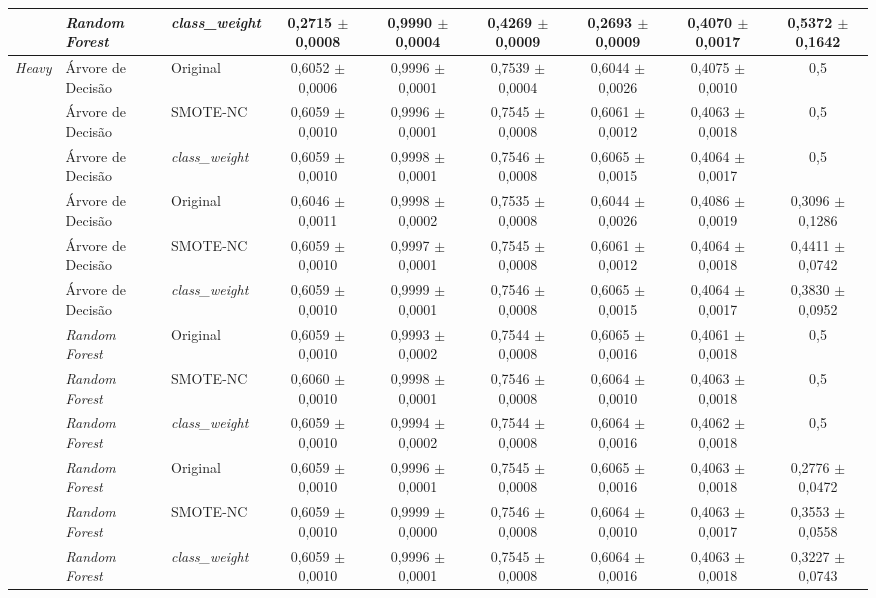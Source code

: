 \begin{table}[htb]
{\begin{tabular}{lllcccccc}
     & \textit{Random Forest} & \textit{class\_weight} & 0,2715 $\pm$ 0,0008 & 0,9990 $\pm$ 0,0004 & 0,4269 $\pm$ 0,0009 & 0,2693 $\pm$ 0,0009 & 0,4070 $\pm$ 0,0017 & 0,5372 $\pm$ 0,1642 \\
    \hline
    \textit{Heavy} & Árvore de Decisão & Original & 0,6052 $\pm$ 0,0006 & 0,9996 $\pm$ 0,0001 & 0,7539 $\pm$ 0,0004 & 0,6044 $\pm$ 0,0026 & 0,4075 $\pm$ 0,0010 & 0,5 \\
     & Árvore de Decisão & SMOTE-NC & 0,6059 $\pm$ 0,0010 & 0,9996 $\pm$ 0,0001 & 0,7545 $\pm$ 0,0008 & 0,6061 $\pm$ 0,0012 & 0,4063 $\pm$ 0,0018 & 0,5 \\
     & Árvore de Decisão & \textit{class\_weight} & 0,6059 $\pm$ 0,0010 & 0,9998 $\pm$ 0,0001 & 0,7546 $\pm$ 0,0008 & 0,6065 $\pm$ 0,0015 & 0,4064 $\pm$ 0,0017 & 0,5 \\
     & Árvore de Decisão & Original & 0,6046 $\pm$ 0,0011 & 0,9998 $\pm$ 0,0002 & 0,7535 $\pm$ 0,0008 & 0,6044 $\pm$ 0,0026 & 0,4086 $\pm$ 0,0019 & 0,3096 $\pm$ 0,1286 \\
     & Árvore de Decisão & SMOTE-NC & 0,6059 $\pm$ 0,0010 & 0,9997 $\pm$ 0,0001 & 0,7545 $\pm$ 0,0008 & 0,6061 $\pm$ 0,0012 & 0,4064 $\pm$ 0,0018 & 0,4411 $\pm$ 0,0742 \\
     & Árvore de Decisão & \textit{class\_weight} & 0,6059 $\pm$ 0,0010 & 0,9999 $\pm$ 0,0001 & 0,7546 $\pm$ 0,0008 & 0,6065 $\pm$ 0,0015 & 0,4064 $\pm$ 0,0017 & 0,3830 $\pm$ 0,0952 \\
     & \textit{Random Forest} & Original & 0,6059 $\pm$ 0,0010 & 0,9993 $\pm$ 0,0002 & 0,7544 $\pm$ 0,0008 & 0,6065 $\pm$ 0,0016 & 0,4061 $\pm$ 0,0018 & 0,5 \\
     & \textit{Random Forest} & SMOTE-NC & 0,6060 $\pm$ 0,0010 & 0,9998 $\pm$ 0,0001 & 0,7546 $\pm$ 0,0008 & 0,6064 $\pm$ 0,0010 & 0,4063 $\pm$ 0,0018 & 0,5 \\
     & \textit{Random Forest} & \textit{class\_weight} & 0,6059 $\pm$ 0,0010 & 0,9994 $\pm$ 0,0002 & 0,7544 $\pm$ 0,0008 & 0,6064 $\pm$ 0,0016 & 0,4062 $\pm$ 0,0018 & 0,5 \\
     & \textit{Random Forest} & Original & 0,6059 $\pm$ 0,0010 & 0,9996 $\pm$ 0,0001 & 0,7545 $\pm$ 0,0008 & 0,6065 $\pm$ 0,0016 & 0,4063 $\pm$ 0,0018 & 0,2776 $\pm$ 0,0472 \\
     & \textit{Random Forest} & SMOTE-NC & 0,6059 $\pm$ 0,0010 & 0,9999 $\pm$ 0,0000 & 0,7546 $\pm$ 0,0008 & 0,6064 $\pm$ 0,0010 & 0,4063 $\pm$ 0,0017 & 0,3553 $\pm$ 0,0558 \\
     & \textit{Random Forest} & \textit{class\_weight} & 0,6059 $\pm$ 0,0010 & 0,9996 $\pm$ 0,0001 & 0,7545 $\pm$ 0,0008 & 0,6064 $\pm$ 0,0016 & 0,4063 $\pm$ 0,0018 & 0,3227 $\pm$ 0,0743 \\

\end{tabular}}
\end{table}
